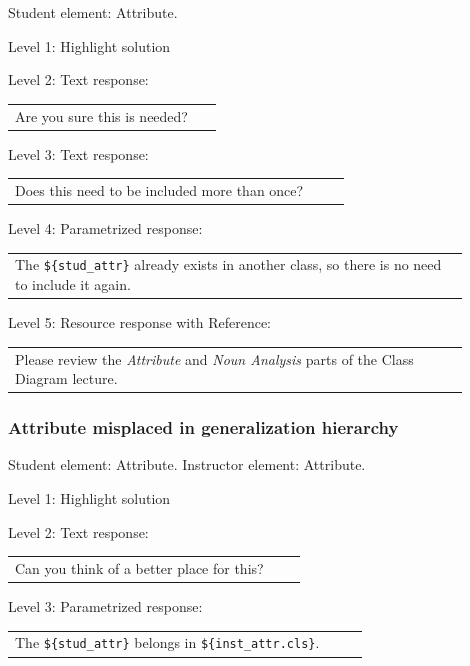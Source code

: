 Student element: Attribute.  \medskip

\noindent Level 1: Highlight solution  \medskip

\noindent Level 2: Text response: \medskip

\begin{tabular}{|p{0.9\linewidth}}
Are you sure this is needed?
\end{tabular} \medskip

\noindent Level 3: Text response: \medskip

\begin{tabular}{|p{0.9\linewidth}}
Does this need to be included more than once?
\end{tabular} \medskip

\noindent Level 4: Parametrized response: \medskip

\begin{tabular}{|p{0.9\linewidth}}
The \verb|${stud_attr}| already exists in another class, so there is no need to include it again.
\end{tabular} \medskip

\noindent Level 5: Resource response with Reference: \medskip

\begin{tabular}{|p{0.9\linewidth}}
Please review the \textit{Attribute} and \textit{Noun Analysis} parts of the Class Diagram lecture.
\end{tabular} \medskip


\subsubsection{Attribute misplaced in generalization hierarchy}

Student element: Attribute. Instructor element: Attribute. \medskip

\noindent Level 1: Highlight solution  \medskip

\noindent Level 2: Text response: \medskip

\begin{tabular}{|p{0.9\linewidth}}
Can you think of a better place for this?
\end{tabular} \medskip

\noindent Level 3: Parametrized response: \medskip

\begin{tabular}{|p{0.9\linewidth}}
The \verb|${stud_attr}| belongs in \verb|${inst_attr.cls}|.
\end{tabular} \medskip

